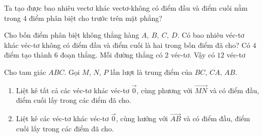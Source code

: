 
\begin{bt}%
	Ta tạo được bao nhiêu vectơ khác vectơ-không có điểm đầu và điểm cuối nằm trong $4$ điểm  phân biệt cho trước trên mặt phẳng?
\end{bt}

\begin{bt}%
	Cho bốn điểm phân biệt không thẳng hàng $A,~B,~C,~D$. Có bao nhiêu véc-tơ khác véc-tơ không có điểm đầu và điểm cuối là hai trong bốn điểm đã cho?
	\loigiai
	{Có $4$ điểm tạo thành $6$ đoạn thẳng. Mỗi đường thẳng có $2$ véc-tơ. Vậy có $12$ véc-tơ}
\end{bt}

\begin{bt}%
	Cho tam giác $ABC$. Gọi $M$, $N$, $P$ lần lượt là trung điểm của $BC$, $CA$, $AB$.
	\begin{enumerate}
		\item Liệt kê tất cả các véc-tơ khác véc-tơ $\overrightarrow{0}$, cùng phương với $\overrightarrow{MN}$ và có điểm đầu, điểm cuối lấy trong các điểm đã cho.
		\item Liệt kê các véc-tơ khác véc-tơ $\overrightarrow{0}$, cùng hướng với $\overrightarrow{AB}$ và có điểm đầu, điểm cuối lấy trong các điểm đã cho.
	\end{enumerate}
\end{bt}

